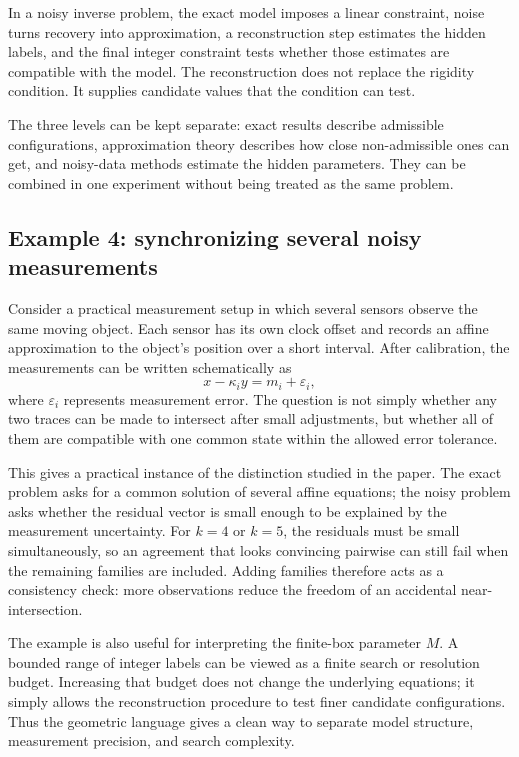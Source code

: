 \documentclass[11pt,a4paper]{article}
\begin{document}
In a noisy inverse problem, the exact model imposes a linear constraint, noise turns recovery into approximation, a reconstruction step estimates the hidden labels, and the final integer constraint tests whether those estimates are compatible with the model. The reconstruction does not replace the rigidity condition. It supplies candidate values that the condition can test.

The three levels can be kept separate: exact results describe admissible configurations, approximation theory describes how close non-admissible ones can get, and noisy-data methods estimate the hidden parameters. They can be combined in one experiment without being treated as the same problem.

\subsection{Example 4: synchronizing several noisy measurements}
Consider a practical measurement setup in which several sensors observe the same moving object. Each
sensor has its own clock offset and records an affine approximation to the object's position over a short
interval. After calibration, the measurements can be written schematically as
\[
 x-\kappa_i y=m_i+\varepsilon_i,
\]
where $\varepsilon_i$ represents measurement error. The question is not simply whether any two traces
can be made to intersect after small adjustments, but whether all of them are compatible with one common
state within the allowed error tolerance.

This gives a practical instance of the distinction studied in the paper. The exact problem asks for a
common solution of several affine equations; the noisy problem asks whether the residual vector is small
enough to be explained by the measurement uncertainty. For $k=4$ or $k=5$, the residuals must be small
simultaneously, so an agreement that looks convincing pairwise can still fail when the remaining families
are included. Adding families therefore acts as a consistency check: more observations reduce the
freedom of an accidental near-intersection.

The example is also useful for interpreting the finite-box parameter $M$. A bounded range of integer
labels can be viewed as a finite search or resolution budget. Increasing that budget does not change the
underlying equations; it simply allows the reconstruction procedure to test finer candidate configurations.
Thus the geometric language gives a clean way to separate model structure, measurement precision, and
search complexity.
\end{document}
